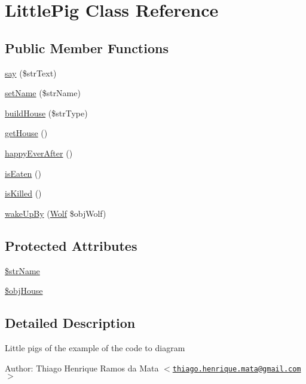 \hypertarget{class_little_pig}{
\section{LittlePig Class Reference}
\label{class_little_pig}
}
\subsection*{Public Member Functions}
\begin{CompactItemize}
\item 
\hyperlink{class_little_pig_0d2d86aa9b7de45757e2d29384b1e549}{say} (\$strText)
\item 
\hyperlink{class_little_pig_c05d9184d52b7a34210a801767bef213}{setName} (\$strName)
\item 
\hyperlink{class_little_pig_082ad68f4d76b0c185027dcbf3a4dc42}{buildHouse} (\$strType)
\item 
\hyperlink{class_little_pig_24a3c5baa4accd4da966da7437d92a6d}{getHouse} ()
\item 
\hyperlink{class_little_pig_11dd4caed12c9780c2dd944d6b024109}{happyEverAfter} ()
\item 
\hyperlink{class_little_pig_990f0b86c82d36f1f94ff331db475c85}{isEaten} ()
\item 
\hyperlink{class_little_pig_ec29070d2544b3cfe0447dcbc5e6c199}{isKilled} ()
\item 
\hyperlink{class_little_pig_ec9bcb744b45ac0a7b30e9e53bddb4d4}{wakeUpBy} (\hyperlink{class_wolf}{Wolf} \$objWolf)
\end{CompactItemize}
\subsection*{Protected Attributes}
\begin{CompactItemize}
\item 
\hyperlink{class_little_pig_90edf7538a74be8ac5ce46baaf203382}{\$strName}
\item 
\hyperlink{class_little_pig_79150187cd5131ac2aa384dc660f3f65}{\$objHouse}
\end{CompactItemize}


\subsection{Detailed Description}
Little pigs of the example of the code to diagram

\begin{Desc}
\item[Author:]Thiago Henrique Ramos da Mata $<$\href{mailto:thiago.henrique.mata@gmail.com}{\tt thiago.henrique.mata@gmail.com}$>$ \end{Desc}


